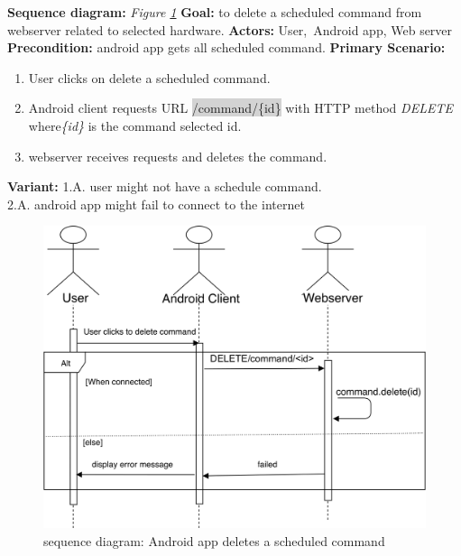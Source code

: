\documentclass[12pt, oneside, a4paper]{book}
\newcommand{\code}[1]{{\color{red}\colorbox{lightgray}{#1}}}
\begin{document}
				\newline\textbf{Sequence diagram:} \textit{Figure \ref{android_del}}
				\newline\textbf{Goal:} to delete a scheduled command from webserver related to selected hardware.
				\newline\textbf{Actors:} User, Android app, Web server
				\newline\textbf{Precondition:} android app gets all scheduled command.
				\newline\textbf{Primary Scenario:}	
				\begin{enumerate}[label*=\arabic*.]
					\item User clicks on delete a scheduled command.
					\item Android client requests URL \code{/command/\{id\}} with HTTP method \textit{DELETE} where\textit{\{id\}} is the command selected id. 
					\item  webserver receives requests and deletes the command.
				\end{enumerate}
				\textbf{Variant:}\newline
				\hspace*{5mm}1.A. user might not have a schedule command. \\
				\hspace*{5mm}2.A. android app might fail to connect to the internet \\
				\begin{figure}[H]
					\includegraphics[width=\linewidth]{img/sequence_android_delete.png}
					\caption{sequence diagram: Android app deletes a scheduled command}
					\label{android_del}
				\end{figure}
\end{document}

